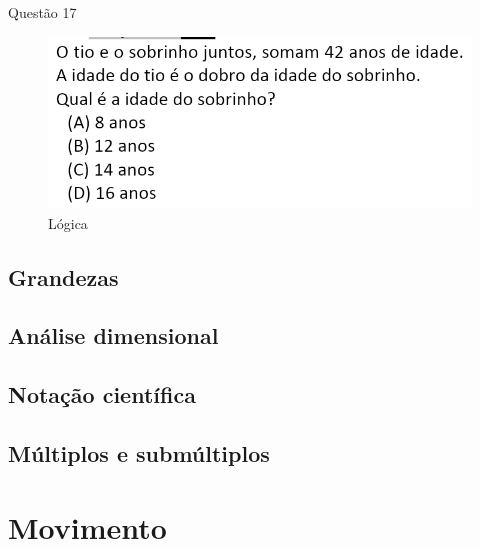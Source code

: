 \documentclass{beamer}
\begin{document}
\begin{frame}{Questão 17}
    \begin{figure}
        \caption{Lógica}
        \includegraphics[scale=0.8]{qst25.56.png}
    \end{figure}
\end{frame}
\subsection{Grandezas}
%
\subsection{Análise dimensional}
%
\subsection{Notação científica}
%
\subsection{Múltiplos e submúltiplos}
\section{Movimento}
\end{document}
